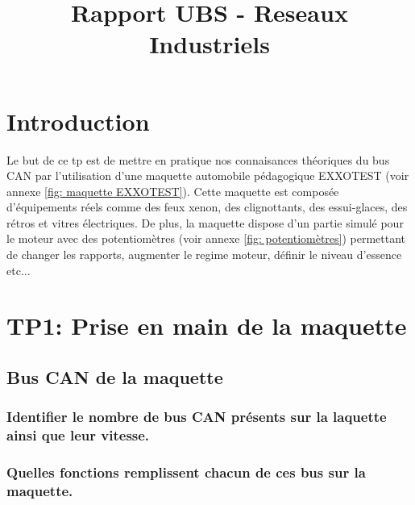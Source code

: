 \documentclass{rapportECC}
\title{Rapport UBS - Reseaux Industriels} %
\begin{document}





        
\fairemarges %
\fairepagedegarde %
\tabledematieres %



\section{Introduction} 

Le but de ce tp est de mettre en pratique nos connaisances théoriques du bus CAN par l'utilisation d'une maquette automobile pédagogique EXXOTEST (voir annexe \ref{fig: maquette EXXOTEST}). Cette maquette est composée d'équipements réels comme des feux xenon, des clignottants, des essui-glaces, des rétros et vitres électriques. De plus, la maquette dispose d'un partie simulé pour le moteur avec des potentiomètres (voir annexe \ref{fig: potentiomètres}) permettant de changer les rapports, augmenter le regime moteur, définir le niveau d'essence etc... 

\section{TP1: Prise en main de la maquette}

\subsection{Bus CAN de la maquette}

\subsubsection*{Identifier le nombre de bus CAN présents sur la laquette ainsi que leur vitesse.}

\subsubsection*{Quelles fonctions remplissent chacun de ces bus sur la maquette.}
\end{document}
